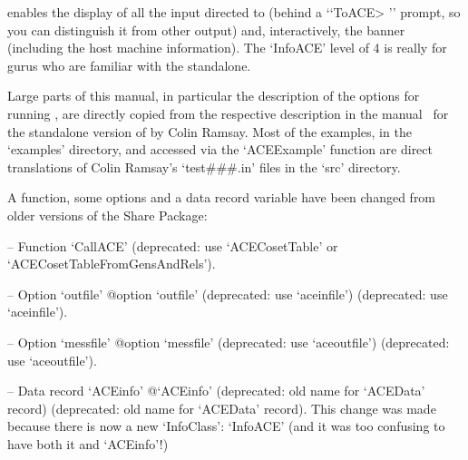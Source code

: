 enables the display of all the input  directed  to  {\ACE}  (behind  a
\lq{}`ToACE> '' prompt, so you can distinguish it from  other  output)
and, interactively, the {\ACE}  banner  (including  the  host  machine
information). The `InfoACE' level of 4 is really  for  gurus  who  are
familiar with the {\ACE} standalone.

\enditems


Large parts of this manual,  in  particular  the  description  of  the
options for running {\ACE}, are directly copied  from  the  respective
description in the manual~\cite{Ram99} for the standalone  version  of
{\ACE} by Colin Ramsay.  Most  of  the  examples,  in  the  `examples'
directory, and accessed  via  the  `ACEExample'  function  are  direct
translations  of  Colin  Ramsay's `test\#\#\#.in' files  in  the `src'
directory.


A function, some options and a data record variable have been changed
from older versions of the {\ACE} Share Package:

\beginlist

\item{--} Function   `CallACE'{\undoquotes{}}  (deprecated:  use
`ACECosetTable' or `ACECosetTableFromGensAndRels').

\item{--} Option    `outfile'{\undoquotes{}
{@option `outfile' (deprecated: use  `aceinfile')}}  (deprecated:  use
`aceinfile').

\item{--} Option    `messfile'{\undoquotes{}
{@option `messfile' (deprecated: use `aceoutfile')}} (deprecated:  use
`aceoutfile').

\item{--} Data      record      `ACEinfo'{\undoquotes{}
{@`ACEinfo' (deprecated: old name for `ACEData' record)}} (deprecated:
old name for `ACEData' record). This change was made because there  is
now a new `InfoClass': `InfoACE' (and it was  too  confusing  to  have
both it and `ACEinfo'!)

\endlist


